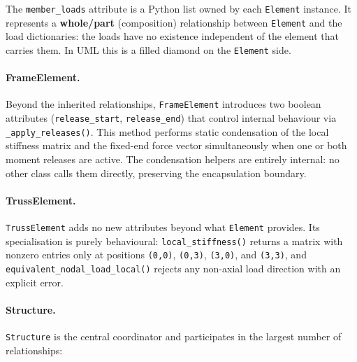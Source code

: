 The \texttt{member\_loads} attribute is a Python list owned by each
\texttt{Element} instance.
It represents a \textbf{whole/part} (composition) relationship between
\texttt{Element} and the load dictionaries: the loads have no existence
independent of the element that carries them.
In UML this is a filled diamond on the \texttt{Element} side.

\paragraph{FrameElement.}
Beyond the inherited relationships, \texttt{FrameElement} introduces two
boolean attributes (\texttt{release\_start}, \texttt{release\_end}) that
control internal behaviour via \texttt{\_apply\_releases()}.
This method performs static condensation of the local stiffness matrix and
the fixed-end force vector simultaneously when one or both moment releases
are active.
The condensation helpers are entirely internal: no other class calls them
directly, preserving the encapsulation boundary.

\paragraph{TrussElement.}
\texttt{TrussElement} adds no new attributes beyond what \texttt{Element}
provides.
Its specialisation is purely behavioural: \texttt{local\_stiffness()}
returns a matrix with nonzero entries only at positions \texttt{(0,0)},
\texttt{(0,3)}, \texttt{(3,0)}, and \texttt{(3,3)}, and
\texttt{equivalent\_nodal\_load\_local()} rejects any non-axial load
direction with an explicit error.

\paragraph{Structure.}
\texttt{Structure} is the central coordinator and participates in the
largest number of relationships:

